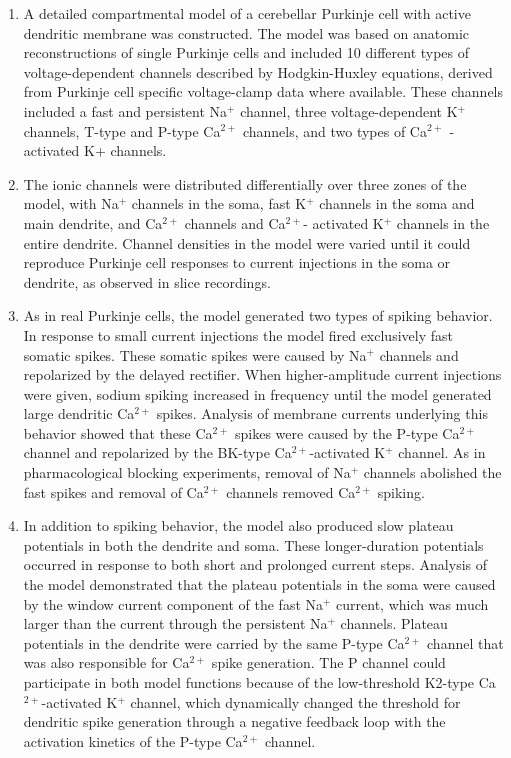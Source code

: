 \documentclass[12pt]{article}
\begin{document}
\begin{enumerate}
\item A detailed compartmental model of a cerebellar Purkinje
cell with active dendritic membrane was constructed. The model
was based on anatomic reconstructions of single Purkinje cells and
included 10 different types of voltage-dependent channels described
by Hodgkin-Huxley equations, derived from Purkinje cell specific
voltage-clamp data where available. These channels included
a fast and persistent Na$^+$ channel, three voltage-dependent
K$^+$ channels, T-type and P-type Ca$^{2+}$ channels, and two types of
Ca$^{2+}$ -activated K+ channels.

\item The ionic channels were distributed differentially over three
zones of the model, with Na$^+$ channels in the soma, fast K$^+$ channels
in the soma and main dendrite, and Ca$^{2+}$ channels and Ca$^{2+}$-
activated K$^+$ channels in the entire dendrite. Channel densities in
the model were varied until it could reproduce Purkinje cell responses
to current injections in the soma or dendrite, as observed
in slice recordings.

\item As in real Purkinje cells, the model generated two types of
spiking behavior. In response to small current injections the
model fired exclusively fast somatic spikes. These somatic spikes
were caused by Na$^+$ channels and repolarized by the delayed rectifier.
When higher-amplitude current injections were given, sodium
spiking increased in frequency until the model generated
large dendritic Ca$^{2+}$ spikes. Analysis of membrane currents underlying this 
behavior showed that these Ca$^{2+}$ spikes were caused by
the P-type Ca$^{2+}$ channel and repolarized by the BK-type Ca$^{2+}$-activated
K$^+$ channel. As in pharmacological blocking experiments,
removal of Na$^+$ channels abolished the fast spikes and removal of
Ca$^{2+}$ channels removed Ca$^{2+}$ spiking.

\item In addition to spiking behavior, the model also produced
slow plateau potentials in both the dendrite and soma. These
longer-duration potentials occurred in response to both short and
prolonged current steps. Analysis of the model demonstrated that
the plateau potentials in the soma were caused by the window
current component of the fast Na$^+$ current, which was much
larger than the current through the persistent Na$^+$ channels.
Plateau potentials in the dendrite were carried by the same P-type
Ca$^{2+}$ channel that was also responsible for Ca$^{2+}$ spike generation.
The P channel could participate in both model functions because
of the low-threshold K2-type Ca$^{2+}$-activated K$^+$ channel, which
dynamically changed the threshold for dendritic spike generation
through a negative feedback loop with the activation kinetics of
the P-type Ca$^{2+}$ channel.


\end{enumerate}
\end{document}

